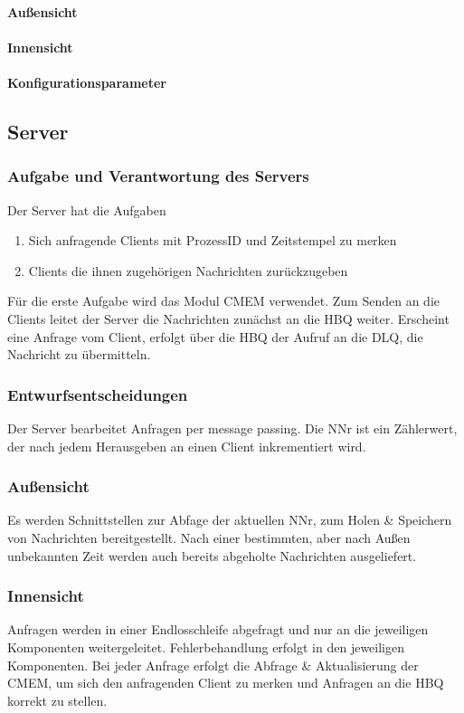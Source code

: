 \documentclass{article}
\begin{document}
			\paragraph{Außensicht}
			\paragraph{Innensicht}
			\paragraph{Konfigurationsparameter}
			
	\subsection{Server}
	
		\subsubsection{Aufgabe und Verantwortung des Servers}
			Der Server hat die Aufgaben  
			\begin{enumerate}
    			\item{Sich anfragende Clients mit ProzessID und Zeitstempel zu merken}
    			\item{Clients die ihnen zugehörigen Nachrichten zurückzugeben}
			\end{enumerate}
			Für die erste Aufgabe wird das Modul CMEM verwendet. 
			Zum Senden an die Clients leitet der Server die Nachrichten zunächst an die HBQ weiter. 
			Erscheint eine Anfrage vom Client, erfolgt über die HBQ der Aufruf an die DLQ, 
			die Nachricht zu übermitteln.
		\subsubsection{Entwurfsentscheidungen}
			Der Server bearbeitet Anfragen per message passing. Die NNr ist ein Zählerwert,
			der nach jedem Herausgeben an einen Client inkrementiert wird.
		\subsubsection{Außensicht}
			Es werden Schnittstellen zur Abfage der aktuellen NNr, zum Holen \& Speichern 
			von Nachrichten bereitgestellt. Nach einer bestimmten, aber nach Außen unbekannten 
			Zeit werden auch bereits abgeholte Nachrichten ausgeliefert.
		\subsubsection{Innensicht}
			Anfragen werden in einer Endlosschleife abgefragt und nur an die jeweiligen 
			Komponenten weitergeleitet. Fehlerbehandlung erfolgt in den jeweiligen Komponenten.
			Bei jeder Anfrage erfolgt die Abfrage \& Aktualisierung der CMEM,
			um sich den anfragenden Client zu merken und Anfragen an die HBQ korrekt zu stellen.
			
\end{document}

